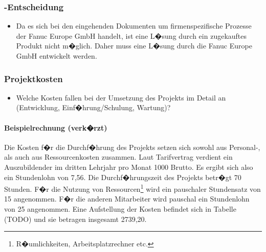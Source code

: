\subsubsection{-Entscheidung}
\label{sec:MakeOrBuyEntscheidung}
\begin{itemize}
	\item Da es sich bei den eingehenden Dokumenten um firmenspezifische Prozesse der Fanuc Europe GmbH handelt, ist eine L�sung durch ein zugekauftes Produkt nicht m�glich. 
	Daher muss eine L�sung durch die Fanuc Europe GmbH entwickelt werden.
\end{itemize}


\subsubsection{Projektkosten}
\label{sec:Projektkosten}
\begin{itemize}
	\item Welche Kosten fallen bei der Umsetzung des Projekts im Detail an (Entwicklung, Einf�hrung/Schulung, Wartung)?
\end{itemize}

\paragraph{Beispielrechnung (verk�rzt)}
Die Kosten f�r die Durchf�hrung des Projekts setzen sich sowohl aus Personal-, als auch aus Ressourcenkosten zusammen.
Laut Tarifvertrag verdient ein Auszubildender im dritten Lehrjahr pro Monat 1000 Brutto. 
Es ergibt sich also ein Stundenlohn von 7,56. 
Die Durchf�hrungszeit des Projekts betr�gt 70 Stunden. F�r die Nutzung von Ressourcen\footnote{R�umlichkeiten, Arbeitsplatzrechner etc.} wird 
ein pauschaler Stundensatz von 15 angenommen. F�r die anderen Mitarbeiter wird pauschal ein Stundenlohn von 25 angenommen. 
Eine Aufstellung der Kosten befindet sich in Tabelle (TODO) und sie betragen insgesamt 2739,20.



